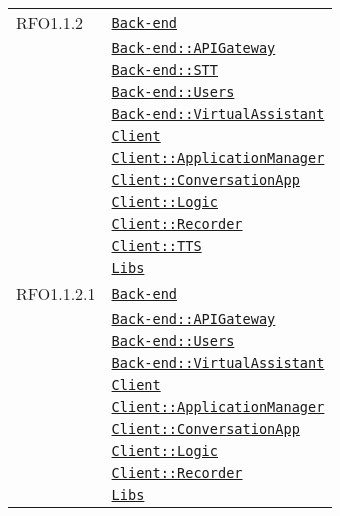 \begin{longtable}{|>{\centering}m{3cm}|m{10cm}<{\centering}|}
RFO1.1.2 & \hyperref[Back-end]{\texttt{Back-end}}\\
& \hyperref[Back-end::APIGateway]{\texttt{Back-end::APIGateway}}\\
& \hyperref[Back-end::STT]{\texttt{Back-end::STT}}\\
& \hyperref[Back-end::Users]{\texttt{Back-end::Users}}\\
& \hyperref[Back-end::VirtualAssistant]{\texttt{Back-end::VirtualAssistant}}\\
& \hyperref[Client]{\texttt{Client}}\\
& \hyperref[Client::ApplicationManager]{\texttt{Client::ApplicationManager}}\\
& \hyperref[Client::ConversationApp]{\texttt{Client::ConversationApp}}\\
& \hyperref[Client::Logic]{\texttt{Client::Logic}}\\
& \hyperref[Client::Recorder]{\texttt{Client::Recorder}}\\
& \hyperref[Client::TTS]{\texttt{Client::TTS}}\\
& \hyperref[Libs]{\texttt{Libs}}\\ \hline

RFO1.1.2.1 & \hyperref[Back-end]{\texttt{Back-end}}\\
& \hyperref[Back-end::APIGateway]{\texttt{Back-end::APIGateway}}\\
& \hyperref[Back-end::Users]{\texttt{Back-end::Users}}\\
& \hyperref[Back-end::VirtualAssistant]{\texttt{Back-end::VirtualAssistant}}\\
& \hyperref[Client]{\texttt{Client}}\\
& \hyperref[Client::ApplicationManager]{\texttt{Client::ApplicationManager}}\\
& \hyperref[Client::ConversationApp]{\texttt{Client::ConversationApp}}\\
& \hyperref[Client::Logic]{\texttt{Client::Logic}}\\
& \hyperref[Client::Recorder]{\texttt{Client::Recorder}}\\
& \hyperref[Libs]{\texttt{Libs}}\\ \hline


\end{longtable}
